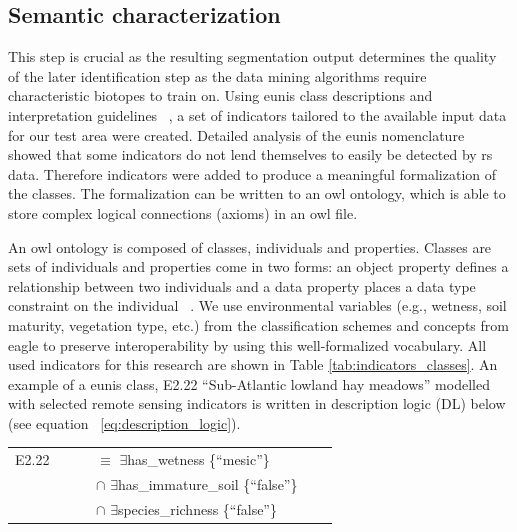 \documentclass[authoryear,review,12pt,number]{elsarticle}
\begin{document}
\subsection{Semantic characterization}
\label{subsec:reference_data_and_semantic_characterisation} 
This step is crucial as the resulting segmentation output determines the 
quality of the later identification step as the data mining algorithms require 
characteristic biotopes to train on. 
Using \gls{eunis} class descriptions and
interpretation guidelines ~\citep{EUNISManual}, a set of indicators 
tailored to the available input data for our test area were created. Detailed
analysis of the \gls{eunis} nomenclature showed that some indicators do not lend themselves 
to easily be detected by \gls{rs} data. Therefore 
indicators were added to produce a meaningful formalization of the classes. The
formalization can be written to an \gls{owl} ontology, which is able to store 
complex logical connections (axioms) in an \gls{owl} file.

An \gls{owl} ontology is composed of classes, individuals and properties. 
Classes are sets of individuals and properties come in two forms: an object 
property defines a relationship between two individuals and a data property  
places a data type constraint on the individual ~\citep{OWL2}. 
We use environmental variables (e.g., wetness, soil maturity, vegetation type,
etc.) from the classification schemes and concepts from \gls{eagle} to preserve
interoperability by using this well-formalized vocabulary. All used indicators
for this research are shown in Table \ref{tab:indicators_classes}. An example of
a \gls{eunis} class, E2.22 ``Sub-Atlantic lowland hay meadows'' modelled with 
selected
remote sensing indicators is written in description logic (DL) below (see
equation ~\ref{eq:description_logic}).

\begin{tabular}[h]{p{0.8cm}l p{2cm}l}
    E2.22 &$\qquad$ {} $\equiv$ $\exists$has\_wetness \{``mesic''\} \\
      \ &$\qquad$ {} $\cap$ $\exists$has\_immature\_soil \{``false''\} \\
     &$\qquad$ {} $\cap$ $\exists$species\_richness \{``false''\} \\
\end{tabular}\label{eq:description_logic}\\


\end{document}
